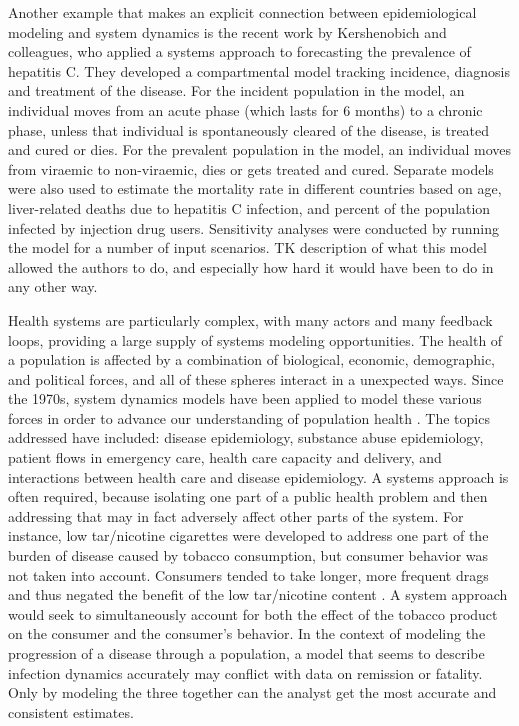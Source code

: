Another example that makes an explicit connection between
epidemiological modeling and system dynamics is the recent work by
Kershenobich and colleagues, who applied a systems approach to
forecasting the prevalence of hepatitis C. They developed a
compartmental model tracking incidence, diagnosis and treatment of the
disease. For the incident population in the model, an individual moves
from an acute phase (which lasts for 6 months) to a chronic phase,
unless that individual is spontaneously cleared of the disease, is
treated and cured or dies. For the prevalent population in the model,
an individual moves from viraemic to non-viraemic, dies or gets
treated and cured. Separate models were also used to estimate the
mortality rate in different countries based on age, liver-related
deaths due to hepatitis C infection, and percent of the population
infected by injection drug users. Sensitivity analyses were conducted
by running the model for a number of input scenarios.  TK description
of what this model allowed the authors to do, and especially how hard
it would have been to do in any other way.

Health systems are particularly complex, with many actors and many
feedback loops, providing a large supply of systems modeling
opportunities. The health of a population is affected by a combination
of biological, economic, demographic, and political forces, and all of
these spheres interact in a unexpected ways. Since the 1970s, system
dynamics models have been applied to model these various forces in
order to advance our understanding of population health \cite{refs
  TK[KP6][ADF7]]}. The topics addressed have included: disease
  epidemiology, substance abuse epidemiology, patient flows in
  emergency care, health care capacity and delivery, and interactions
  between health care and disease epidemiology. A systems approach is
  often required, because isolating one part of a public health
  problem and then addressing that may in fact adversely affect other
  parts of the system. For instance, low tar/nicotine cigarettes were
  developed to address one part of the burden of disease caused by
  tobacco consumption, but consumer behavior was not taken into
  account. Consumers tended to take longer, more frequent drags and
  thus negated the benefit of the low tar/nicotine content
  \cite{Sterman_Learning_2006,[ref [KP8]TK]}. A system approach would
  seek to simultaneously account for both the effect of the tobacco
  product on the consumer and the consumer's behavior. In the context
  of modeling the progression of a disease through a population, a
  model that seems to describe infection dynamics accurately may
  conflict with data on remission or fatality. Only by modeling the
  three together can the analyst get the most accurate and consistent
  estimates.

